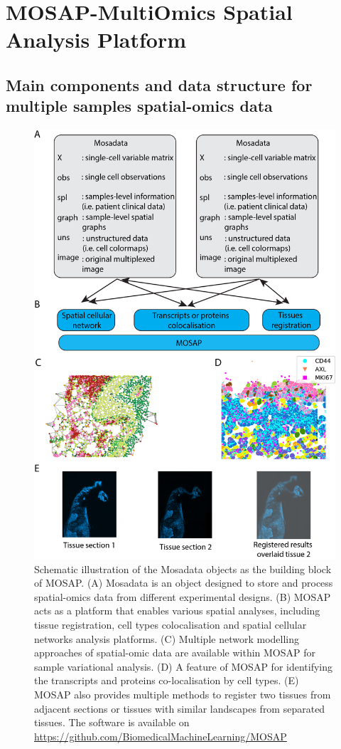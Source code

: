 \section{MOSAP-MultiOmics Spatial Analysis Platform}
\label{Sec:4.2_Methods}
\subsection{Main components and data structure for multiple samples spatial-omics data}

\begin{figure}
    \centering
    \includegraphics[width=0.8\columnwidth]{Chapter4/Figures/Chap4_MOSAP_DS.png}
    \caption[Schematic illustration of the Mosadata objects as the building block of MOSAP]{Schematic illustration of the Mosadata objects as the building block of MOSAP. (A) Mosadata is an object designed to store and process spatial-omics data from different experimental designs. (B) MOSAP acts as a platform that enables various spatial analyses, including tissue registration, cell types colocalisation and spatial cellular networks analysis platforms. (C) Multiple network modelling approaches of spatial-omic data are available within MOSAP for sample variational analysis. (D) A feature of MOSAP for identifying the transcripts and proteins co-localisation by cell types. (E) MOSAP also provides multiple methods to register two tissues from adjacent sections or tissues with similar landscapes from separated tissues. The software is available on  \href{Github}{https://github.com/BiomedicalMachineLearning/MOSAP}}
    \label{Chap4:fig:MOSAP_OOP}
\end{figure}

